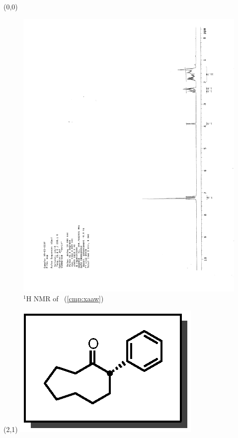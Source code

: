 \begin{textblock}{20}(0,0)
\begin{figure}[htb]
\caption{$^1$H NMR of \CMPxaaw\ (\ref{cmp:xaaw})}
\includegraphics[scale=0.75, trim = 0mm 0mm 0mm 5mm,
clip]{chp_asymmetric/images/nmr/xaawH}
\vspace{-100pt}
\end{figure}
\end{textblock}
\begin{textblock}{1}(2,1)
\includegraphics[scale=0.8, angle=90]{chp_asymmetric/images/xaaw}
\end{textblock}
